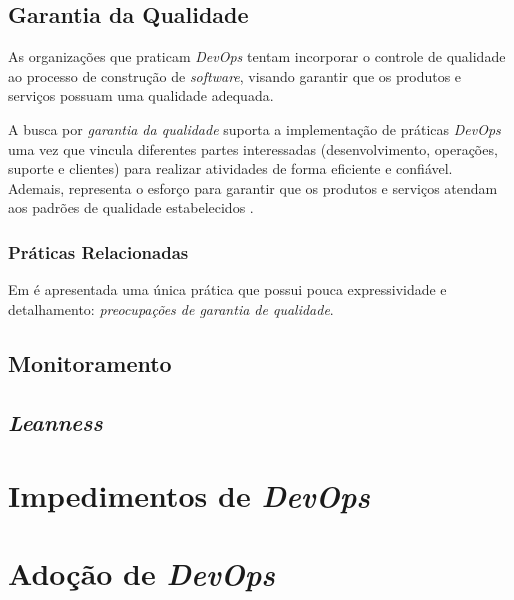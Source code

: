 \subsection{Garantia da Qualidade}

As organizações que praticam \textit{DevOps} tentam incorporar o controle de
qualidade ao processo de construção de \textit{software}, visando garantir
que os produtos e serviços possuam uma qualidade adequada.

A busca por \emph{garantia da qualidade} suporta a implementação de práticas
\textit{DevOps} uma vez que vincula diferentes partes interessadas
(desenvolvimento, operações, suporte e clientes) para realizar atividades de
forma eficiente e confiável. Ademais, representa o esforço para garantir que
os produtos e serviços atendam aos padrões de qualidade estabelecidos
\cite{characterizing_devops}.

\subsubsection{Práticas Relacionadas}

Em \cite{characterizing_devops} é apresentada uma única prática que possui
pouca expressividade e detalhamento: \emph{preocupações de garantia de
qualidade}.

\subsection{Monitoramento}

\subsection{\textit{Leanness}}

\section{Impedimentos de \textit{DevOps}}

\section{Adoção de \textit{DevOps}}
